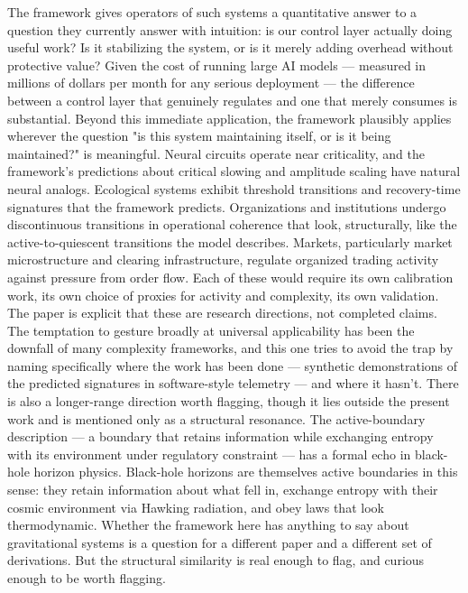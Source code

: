 \documentclass[12pt]{article}
\begin{document}
The framework gives operators of such systems a quantitative answer to a question they currently answer with intuition: is our control layer actually doing useful work? Is it stabilizing the system, or is it merely adding overhead without protective value? Given the cost of running large AI models --- measured in millions of dollars per month for any serious deployment --- the difference between a control layer that genuinely regulates and one that merely consumes is substantial. Beyond this immediate application, the framework plausibly applies wherever the question "is this system maintaining itself, or is it being maintained?" is meaningful. Neural circuits operate near criticality, and the framework's predictions about critical slowing and amplitude scaling have natural neural analogs. Ecological systems exhibit threshold transitions and recovery-time signatures that the framework predicts. Organizations and institutions undergo discontinuous transitions in operational coherence that look, structurally, like the active-to-quiescent transitions the model describes. Markets, particularly market microstructure and clearing infrastructure, regulate organized trading activity against pressure from order flow. Each of these would require its own calibration work, its own choice of proxies for activity and complexity, its own validation. The paper is explicit that these are research directions, not completed claims. The temptation to gesture broadly at universal applicability has been the downfall of many complexity frameworks, and this one tries to avoid the trap by naming specifically where the work has been done --- synthetic demonstrations of the predicted signatures in software-style telemetry --- and where it hasn't. There is also a longer-range direction worth flagging, though it lies outside the present work and is mentioned only as a structural resonance. The active-boundary description --- a boundary that retains information while exchanging entropy with its environment under regulatory constraint --- has a formal echo in black-hole horizon physics. Black-hole horizons are themselves active boundaries in this sense: they retain information about what fell in, exchange entropy with their cosmic environment via Hawking radiation, and obey laws that look thermodynamic. Whether the framework here has anything to say about gravitational systems is a question for a different paper and a different set of derivations. But the structural similarity is real enough to flag, and curious enough to be worth flagging.


\end{document}
